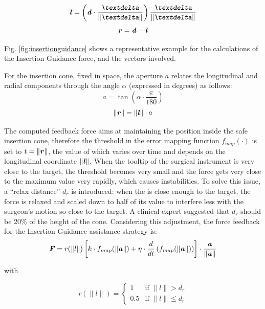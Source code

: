 \documentclass[../main.tex]{subfiles}
\begin{document}
\begin{equation}
    \vect{l} =  \left(\vect{d}\cdot \frac{\vect{\textdelta}}{\|\vect{\textdelta}\|} \right) \frac{\vect{\textdelta}}{\|\vect{\textdelta}\|}
\end{equation} 
\begin{equation}
    \textbf{\textit{r}} = \textbf{\textit{d}} - \textbf{\textit{l}}
\end{equation}

Fig. \ref{fig:insertionguidance} shows a representative example for the calculations of the Insertion Guidance \vf force, and the vectors involved.

For the insertion cone, fixed in space, the aperture $a$ relates the longitudinal and radial components through the angle $\alpha$ (expressed in degrees) as follows:
\begin{equation}
    a = \tan\left(\alpha\cdot\frac{\pi}{180}\right)
\end{equation}
\begin{equation}
    \|\textbf{\textit{r}}\| = \|\textbf{\textit{l}}\|\cdot a
\end{equation}


The computed feedback force aims at maintaining the \ee position inside the safe insertion cone, therefore the threshold in the error mapping function $f_{map}(\cdot)$ is set to $t = \|\textbf{\textit{r}}\|$, the value of which varies over time and depends on the longitudinal coordinate $\|\textbf{\textit{l}}\|$. When the tooltip of the surgical instrument is very close to the target, the threshold becomes very small and the force gets very close to the maximum value very rapidly, which causes instabilities. To solve this issue, a ``relax distance'' $d_r$ is introduced: when the \ee is close enough to the target, the force is relaxed and scaled down to half of its value to interfere less with the surgeon's motion so close to the target. A clinical expert suggested that $d_r$ should be 20\% of the height of the cone. Considering this adjustment, the force feedback for the Insertion Guidance assistance strategy is:
\begin{equation}
    \textbf{\textit{F}} = r(\|l\|)\left[k\cdot f_{map}(\|\textbf{\textit{a}}\|) + \eta\cdot \frac{d}{dt} \left( f_{map}(\|\textbf{\textit{a}}\|)\right)\right]\cdot \frac{\textbf{\textit{a}}}{\|\textbf{\textit{a}}\|}
    \label{eq:insertionguidance}
\end{equation}

with

\begin{equation}
    r(\|l\|) = 
    \begin{cases}
        1 & \text{if } \|l\| > d_r \\
        0.5 & \text{if } \|l\| \leq d_r
    \end{cases}
\end{equation}
\end{document}
